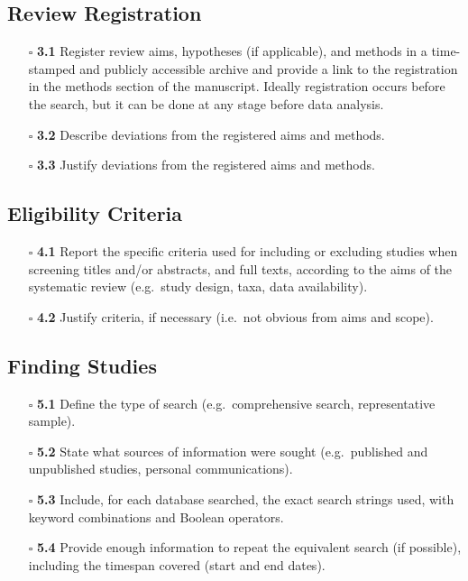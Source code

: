 \documentclass[11pt]{article}
\def\tightlist{}
\begin{document}
\begin{Form}
\subsection{Review Registration}\label{review-registration}

\begin{itemize}
\tightlist
\item[$\square$]
  \textbf{3.1} Register review aims, hypotheses (if applicable), and
  methods in a time-stamped and publicly accessible archive and provide
  a link to the registration in the methods section of the manuscript.
  Ideally registration occurs before the search, but it can be done at
  any stage before data analysis.
\item[$\square$]
  \textbf{3.2} Describe deviations from the registered aims and methods.
\item[$\square$]
  \textbf{3.3} Justify deviations from the registered aims and methods.
\end{itemize}

\subsection{Eligibility Criteria}\label{eligibility-criteria}

\begin{itemize}
\tightlist
\item[$\square$]
  \textbf{4.1} Report the specific criteria used for including or
  excluding studies when screening titles and/or abstracts, and full
  texts, according to the aims of the systematic review (e.g.~study
  design, taxa, data availability).
\item[$\square$]
  \textbf{4.2} Justify criteria, if necessary (i.e.~not obvious from
  aims and scope).
\end{itemize}

\subsection{Finding Studies}\label{finding-studies}

\begin{itemize}
\tightlist
\item[$\square$]
  \textbf{5.1} Define the type of search (e.g.~comprehensive search,
  representative sample).
\item[$\square$]
  \textbf{5.2} State what sources of information were sought
  (e.g.~published and unpublished studies, personal communications).
\item[$\square$]
  \textbf{5.3} Include, for each database searched, the exact search
  strings used, with keyword combinations and Boolean operators.
\item[$\square$]
  \textbf{5.4} Provide enough information to repeat the equivalent
  search (if possible), including the timespan covered (start and end
  dates).
\end{itemize}


\end{Form}
\end{document}
